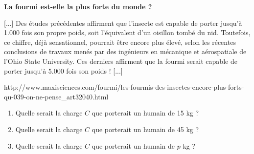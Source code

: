 
\textbf{La fourmi est-elle la plus forte du monde ?}

[...] Des études précédentes affirment que l’insecte est capable de porter jusqu’à 1.000 fois son propre poids, soit l’équivalent d’un oisillon tombé du nid. Toutefois, ce chiffre, déjà sensationnel, pourrait être encore plus élevé, selon les récentes conclusions de travaux menés par des ingénieurs en mécanique et aérospatiale de l'Ohio State University. Ces derniers affirment que la fourmi serait capable de porter jusqu'à 5.000 fois son poids !
[...]

 http://www.maxisciences.com/fourmi/les-fourmis-des-insectes-encore-plus-forts-qu-039-on-ne-pense_art32040.html

\begin{enumerate}
\item Quelle serait la charge $C$ que porterait un humain de 15 kg ?

 
\item Quelle serait la charge $C$ que porterait un humain de 45 kg ?

 
\item Quelle serait la charge $C$ que porterait un humain de $p$ kg ?
 
\end{enumerate}